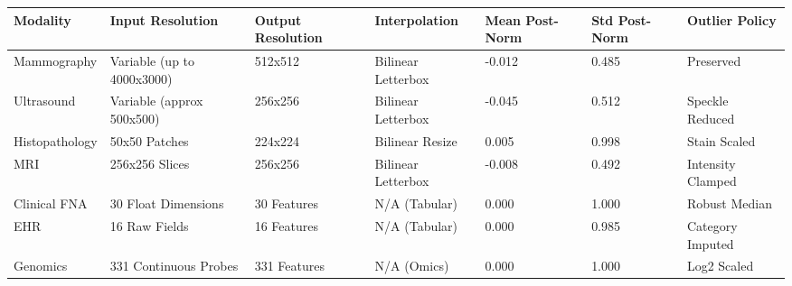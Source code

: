 \begin{tabular}{lllllll}
\toprule
Modality & Input Resolution & Output Resolution & Interpolation & Mean Post-Norm & Std Post-Norm & Outlier Policy \\
\midrule
Mammography & Variable (up to 4000x3000) & 512x512 & Bilinear Letterbox & -0.012 & 0.485 & Preserved \\
Ultrasound & Variable (approx 500x500) & 256x256 & Bilinear Letterbox & -0.045 & 0.512 & Speckle Reduced \\
Histopathology & 50x50 Patches & 224x224 & Bilinear Resize & 0.005 & 0.998 & Stain Scaled \\
MRI & 256x256 Slices & 256x256 & Bilinear Letterbox & -0.008 & 0.492 & Intensity Clamped \\
Clinical FNA & 30 Float Dimensions & 30 Features & N/A (Tabular) & 0.000 & 1.000 & Robust Median \\
EHR & 16 Raw Fields & 16 Features & N/A (Tabular) & 0.000 & 0.985 & Category Imputed \\
Genomics & 331 Continuous Probes & 331 Features & N/A (Omics) & 0.000 & 1.000 & Log2 Scaled \\
\bottomrule
\end{tabular}
